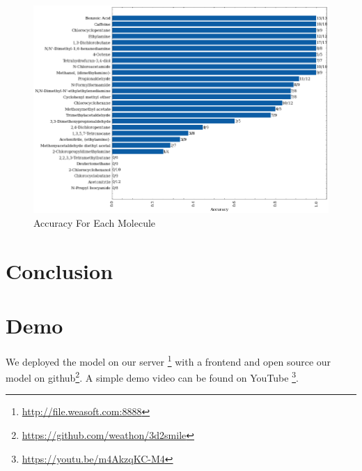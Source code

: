 \documentclass[12pt]{article}
\begin{document}
\begin{figure}[t]
    \centering
    \includegraphics[width=0.8\linewidth]{image.png}
    \caption{Accuracy For Each Molecule}
    \label{fig:acc_each}
\end{figure}
\section{Conclusion}
\section{Demo}
We deployed the model on our server \footnote{\url{http://file.weasoft.com:8888}} with a frontend and open source our model on github\footnote{\url{https://github.com/weathon/3d2smile}}. A simple demo video can be found on YouTube \footnote{\url{https://youtu.be/m4AkzqKC-M4}}. 
\end{document}
